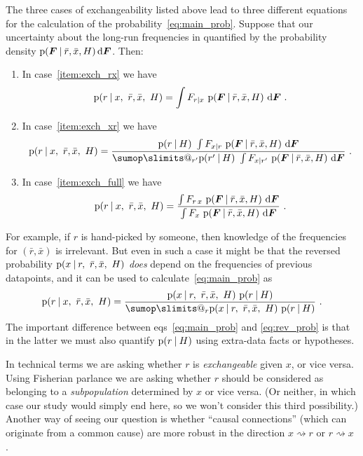 \documentclass[\ifafour a4paper,12pt,\else a5paper,10pt,\fi%
onecolumn,oneside,article,%
british%
]{memoir}
\makeatletter
\theoremstyle{remark}
\theoremstyle{innote}
\def\sum{\DOTSI\sumop\slimits@}
\newcommand*{\citey}{\parencites*}
\newcommand*{\di}{\mathrm{d}}%
\newcommand*{\p}{\mathrm{p}}%
\renewcommand*{\|}[1][]{\nonscript\:#1\vert\nonscript\:\mathopen{}}
\renewcommand*{\=}{\TextOrMath\texteq\eq}
\newcommand*{\sects}{\S\S}%
\newcommand*{\eqns}{eqs}%
\newcommand*{\cf}{{cf.}}
\newcommand*{\q}{}%
\DeclareRobustCommand*{\q}{%
  \mathord{\mathpalette\bigcdot@{}}%
}
\newcommand*{\bigcdot@scalefactor}{0.7}
\newcommand*{\bigcdot@widthfactor}{1.5}
\newcommand*{\bigcdot@}[2]{%
  \sbox0{$#1\vcenter{}$}%
  \sbox2{$#1\cdot\m@th$}%
  \hbox to \bigcdot@widthfactor\wd2{%
    \hfil
    \raise\ht0\hbox{%
      \scalebox{\bigcdot@scalefactor}{%
        \lower\ht0\hbox{$#1\bullet\m@th$}%
      }%
    }%
    \hfil
  }%
}
\newcommand*{\ro}{r}
\newcommand*{\xo}{x}
\newcommand*{\rd}{\bar{r}}
\newcommand*{\xd}{\bar{x}}
\newcommand*{\yF}{\bm{F}}
\makeatother
\begin{document}
\bigskip



The three cases of exchangeability listed above lead to three different
equations for the calculation of the probability~\eqref{eq:main_prob}.
Suppose that our uncertainty about the long-run frequencies in quantified
by the probability density $\p(\yF\|\rd,\xd, H)\,\di\yF$. Then:
\begin{enumerate}[label=\Roman*.]
\item In case~\ref{item:exch_rx} we have
  \begin{equation}
    \label{eq:prob_rx_case_rx}
    \p(\ro \| \xo,\ \rd,\xd,\ H) =
    \int F_{\ro\mid\xo} \ \p(\yF\|\rd,\xd, H)\ \di\yF \ .
  \end{equation}
\item In case~\ref{item:exch_xr} we have
  \begin{equation}
    \label{eq:prob_rx_case_xr}
    \p(\ro \| \xo,\ \rd,\xd,\ H) =
    \frac{
     \p(\ro\| H)\  \int F_{\xo\mid\ro} \ \p(\yF\|\rd,\xd, H)\ \di\yF
    }{
     \sum_{r'} \p(r' \| H)\  \int F_{\xo\mid r'} \ \p(\yF\|\rd,\xd, H)\ \di\yF
      } \ .
  \end{equation}
\item In case~\ref{item:exch_full} we have
  \begin{equation}
    \label{eq:prob_rx_case_full}
    \p(\ro \| \xo,\ \rd,\xd,\ H) =
    \frac{
     \int F_{\ro\,\xo} \ \p(\yF\|\rd,\xd, H)\ \di\yF
    }{
     \int F_{\q\xo} \ \p(\yF\|\rd,\xd, H)\ \di\yF
      } \ .
  \end{equation}
\end{enumerate}

For example, if $\ro$ is
hand-picked by someone, then knowledge of the frequencies for $(\rd,\xd)$
is irrelevant. But even in such a case it might be that the reversed
probability $\p(\xo \| \ro,\ \rd,\xd,\ H)$ \emph{does} depend on the
frequencies of previous datapoints, and it can be used to
calculate~\eqref{eq:main_prob} as
\begin{equation}
  \label{eq:rev_prob}
  \p(\ro \| \xo,\ \rd,\xd,\ H) =
  \frac{\p(\xo \| \ro,\ \rd,\xd,\ H)\ \p(\ro \| H)}{
    \sum_{\ro}\p(\xo \| \ro,\ \rd,\xd,\ H)\ \p(\ro \| H)}
\ .
\end{equation}
The important difference between \eqns~\eqref{eq:main_prob} and
\eqref{eq:rev_prob} is that in the latter we must also quantify
$\p(\ro \| H)$ using extra-data facts or hypotheses.

In technical terms we are asking whether $\ro$ is \emph{exchangeable}
given $\xo$, or vice versa. Using Fisherian \citey[\sects~II.4,
IV.1]{fisher1956} parlance we are asking whether $\ro$ should be
considered as belonging to a \emph{subpopulation} determined by $\xo$ or
vice versa. (Or neither, in which case our study would simply end here, so
we won't consider this third possibility.) Another way of seeing our
question is whether \enquote{causal connections} (which can originate from
a common cause) are more robust in the direction
$\xo \rightsquigarrow \ro$ or $\ro \rightsquigarrow \xo$
\parencites[\cf][\sects~2.1.2, 2.2.5]{pearl1988}.
\end{document}
